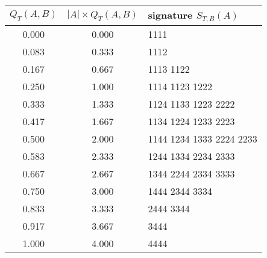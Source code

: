 \begin{tabular}{c|c|l}
$Q_T(A,B)$ & $|A| \times Q_T(A,B)$ & signature $S_{T,B}(A)$ \\\hline
 0.000 & 0.000 & 1111 \\
 0.083 & 0.333 & 1112 \\
 0.167 & 0.667 & 1113 1122 \\
 0.250 & 1.000 & 1114 1123 1222 \\
 0.333 & 1.333 & 1124 1133 1223 2222 \\
 0.417 & 1.667 & 1134 1224 1233 2223 \\
 0.500 & 2.000 & 1144 1234 1333 2224 2233 \\
 0.583 & 2.333 & 1244 1334 2234 2333 \\
 0.667 & 2.667 & 1344 2244 2334 3333 \\
 0.750 & 3.000 & 1444 2344 3334 \\
 0.833 & 3.333 & 2444 3344 \\
 0.917 & 3.667 & 3444 \\
 1.000 & 4.000 & 4444
\end{tabular}
% 
% 
% 
% 
% 
% 
